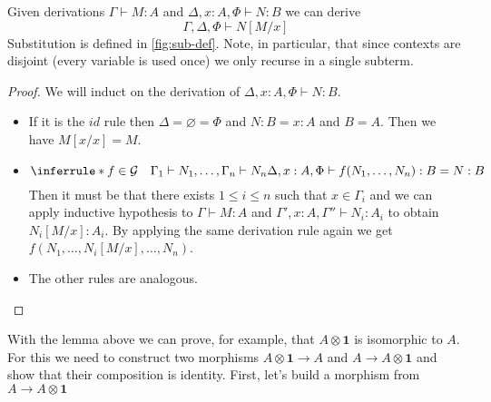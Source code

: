 \documentclass[acmsmall,screen, nonacm, anonymous]{acmart}
\begin{document}
\begin{lemma}
  Given derivations $\Gamma \vdash M : A$ and $\Delta, x : A, \Phi \vdash N : B$ we can derive
  \[
  \Gamma, \Delta, \Phi \vdash N[M / x]
  \]
  Substitution is defined in \cref{fig:sub-def}.
  Note, in particular, that since contexts are disjoint (every variable is used once) we only recurse in a single subterm.
\end{lemma}
\begin{proof}
  We will induct on the derivation of $\Delta, x : A, \Phi \vdash N : B$.
  \begin{itemize}
    \item If it is the $id$ rule then $\Delta = \varnothing = \Phi$ and $N : B = x : A$ and $B = A$. Then we have $M[x/x] = M$.
    \item  
    \[
    \inferrule*{f \in \mathcal{G} \quad \Gamma_1 \vdash N_1, \ldots, \Gamma_n \vdash N_n}{\Delta , x : A, \Phi \vdash f(N_1, \ldots, N_n) : B = N : B}
    \]
    Then it must be that there exists $1 \leq i \leq n$ such that $x \in \Gamma_i$ and we can apply inductive hypothesis to $\Gamma \vdash M : A$ and $\Gamma', x : A, \Gamma'' \vdash N_i : A_i$ to obtain $N_i[M/x] : A_i$.
    By applying the same derivation rule again we get $f(N_1, \ldots, N_i[M/x], \ldots, N_n)$.
    \item The other rules are analogous.
  \end{itemize}
\end{proof}

With the lemma above we can prove, for example, that $A \otimes \mathbf{1}$ is isomorphic to $A$.
For this we need to construct two morphisms $A \otimes \mathbf{1} \to A$ and $A \to A \otimes \mathbf{1}$ and show that their composition is identity.
First, let's build a morphism from $A \to A \otimes \mathbf{1}$
\end{document}
